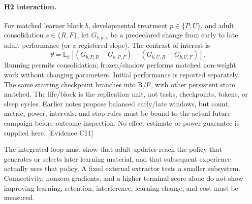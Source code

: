 \documentclass[11pt]{article}
\newcommand{\ev}[1]{\textsf{[Evidence #1]}}
\begin{document}
\paragraph{H2 interaction.} For matched learner block $b$, developmental treatment
$p\in\{P,U\}$, and adult consolidation $s\in\{R,F\}$, let $G_{b,p,s}$ be a
predeclared change from early to late adult performance (or a registered slope).
The contrast of interest is
\[
 \theta=\mathbb{E}_b[(G_{b,P,R}-G_{b,P,F})-(G_{b,U,R}-G_{b,U,F})].
\]
Running permits consolidation; frozen/shadow performs matched non-weight work
without changing parameters. Initial performance is reported separately. The
same starting checkpoint branches into R/F, with other persistent state matched.
The life/block is the replication unit, not tasks, checkpoints, tokens, or sleep
cycles. Earlier notes propose balanced early/late windows, but count, metric,
power, intervals, and stop rules must be bound to the actual future campaign
before outcome inspection. No effect estimate or power guarantee is supplied
here. \ev{C11}

The integrated loop must show that adult updates reach the policy that generates
or selects later learning material, and that subsequent experience actually uses
that policy. A fixed external extractor tests a smaller subsystem. Connectivity,
nonzero gradients, and a higher terminal score alone do not show improving
learning; retention, interference, learning change, and cost must be measured.
\end{document}
